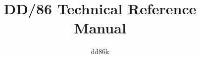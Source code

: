 \documentclass[12pt,a4paper]{book}
\title{DD/86 Technical Reference Manual}
\author{dd86k}
\begin{document}
\maketitle

\large\tableofcontents






\end{document}
